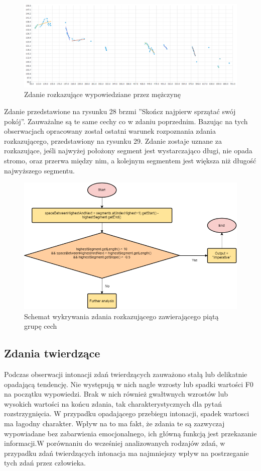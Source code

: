 \documentclass[a4paper,12 pt]{report}
\begin{document}
 \FloatBarrier
\begin{figure}[h]
\centering
\includegraphics[scale=0.6]{rozkaz_6.png}
\caption{Zdanie rozkazujące wypowiedziane przez mężczynę}
\end{figure}
\FloatBarrier
Zdanie przedstawione na rysunku 28 brzmi ''Skończ najpierw sprzątać swój pokój''. Zauważalne są te same cechy co w zdaniu poprzednim. Bazując na tych obserwacjach opracowany został ostatni warunek rozpoznania zdania rozkazującego, przedstawiony na rysunku 29. Zdanie zostaje uznane za rozkazujące, jeśli najwyżej położony segment jest wystarczająco długi, nie opada stromo, oraz przerwa między nim, a kolejnym segmentem jest większa niż długość najwyższego segmentu.
 \FloatBarrier
\begin{figure}[h]
\centering
\includegraphics[scale=0.9]{Imperative5.png}
\caption{Schemat wykrywania zdania rozkazującego zawierającego piątą grupę cech}
\end{figure}
\FloatBarrier

\subsection{Zdania twierdzące}
Podczas obserwacji intonacji zdań twierdzących zauważono stałą lub delikatnie opadającą tendencję. Nie występują w nich nagłe wzrosty lub spadki wartości F0 na początku wypowiedzi. Brak w nich również gwałtwnych wzrostów lub wysokich wartości na końcu zdania, tak charakterystycznych dla pytań rozstrzygnięcia.
W przypadku opadającego przebiegu intonacji, spadek wartosci ma łagodny charakter. Wpływ na to ma fakt, że zdania te są zazwyczaj wypowiadane bez zabarwienia emocjonalnego, ich główną funkcją jest przekazanie informacji.W porównaniu do wcześniej analizowanych rodzajów zdań, w przypadku zdań twierdzących intonacja ma najmniejszy wpływ na postrzeganie tych zdań przez człowieka.
\end{document}
